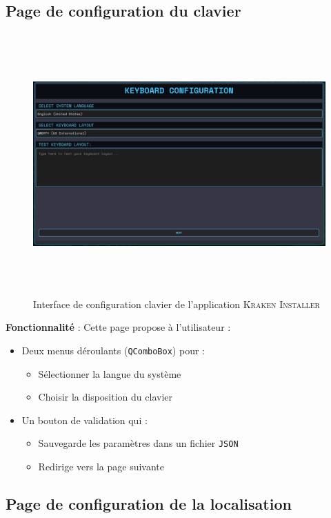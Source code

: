 \subsection{Page de configuration du clavier}
\begin{figure}[H]
  \centering
  \includegraphics[width=1\textwidth, height=10cm]{images_pfe/keyboard.png}
  \caption{Interface de configuration clavier de l'application \textsc{Kraken Installer}}
  \label{fig:keyboardpage}
\end{figure}

\textbf{Fonctionnalité} : Cette page propose à l'utilisateur :
\begin{itemize}
    \item Deux menus déroulants (\texttt{QComboBox}) pour :
    \begin{itemize}
        \item Sélectionner la langue du système
        \item Choisir la disposition du clavier
    \end{itemize}
    \item Un bouton de validation qui :
    \begin{itemize}
        \item Sauvegarde les paramètres dans un fichier \texttt{JSON}
        \item Redirige vers la page suivante
    \end{itemize}
\end{itemize}



\subsection{ Page de configuration de la localisation}

